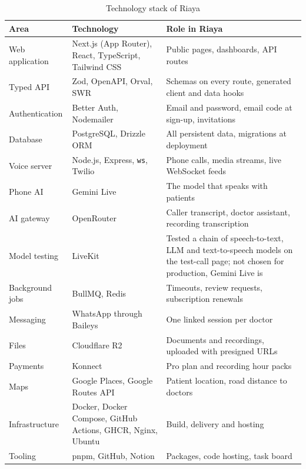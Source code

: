 \begin{table}[H]
    \centering
    \caption{Technology stack of Riaya}
    \label{tab:stack}
    \small
    \begin{tabular}{>{\raggedright\arraybackslash}p{\dimexpr 0.2286\dimexpr\textwidth-6\tabcolsep\relax\relax}>{\raggedright\arraybackslash}p{\dimexpr 0.3286\dimexpr\textwidth-6\tabcolsep\relax\relax}>{\raggedright\arraybackslash}p{\dimexpr 0.4429\dimexpr\textwidth-6\tabcolsep\relax\relax}}
        \toprule
        \textbf{Area} & \textbf{Technology} & \textbf{Role in Riaya} \\
        \midrule
        Web application & Next.js (App Router), React, TypeScript, Tailwind CSS & Public pages, dashboards, API routes \\
        Typed API & Zod, OpenAPI, Orval, SWR & Schemas on every route, generated client and data hooks \\
        Authentication & Better Auth, Nodemailer & Email and password, email code at sign-up, invitations \\
        Database & PostgreSQL, Drizzle ORM & All persistent data, migrations at deployment \\
        Voice server & Node.js, Express, \texttt{ws}, Twilio & Phone calls, media streams, live WebSocket feeds \\
        Phone AI & Gemini Live & The model that speaks with patients \\
        AI gateway & OpenRouter & Caller transcript, doctor assistant, recording transcription \\
        Model testing & LiveKit & Tested a chain of speech-to-text, LLM and text-to-speech models on the test-call page; not chosen for production, Gemini Live is \\
        Background jobs & BullMQ, Redis & Timeouts, review requests, subscription renewals \\
        Messaging & WhatsApp through Baileys & One linked session per doctor \\
        Files & Cloudflare R2 & Documents and recordings, uploaded with presigned URLs \\
        Payments & Konnect & Pro plan and recording hour packs \\
        Maps & Google Places, Google Routes API & Patient location, road distance to doctors \\
        Infrastructure & Docker, Docker Compose, GitHub Actions, GHCR, Nginx, Ubuntu & Build, delivery and hosting \\
        Tooling & pnpm, GitHub, Notion & Packages, code hosting, task board \\
        \bottomrule
    \end{tabular}
    \\[0.2cm]
\end{table}

